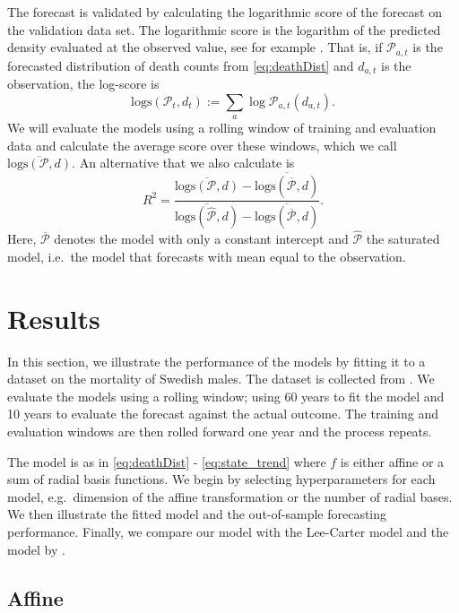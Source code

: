 \documentclass[11pt]{article}
\begin{document}
The forecast is validated by calculating the logarithmic score of the forecast on the validation data set. The logarithmic score is the logarithm of the predicted density evaluated at the observed value, see for example \cite{gneiting2007strictly}. That is, if $\mathcal P_{a,t}$ is the forecasted distribution of death counts from \eqref{eq:deathDist} and $d_{a,t}$ is the observation, the log-score is
$$
\text{logs}(\mathcal P_{t}, d_{t}) := \sum_a \log \mathcal P_{a,t}(d_{a,t}).
$$
We will evaluate the models using a rolling window of training and evaluation data and calculate the average score over these windows, which we call $\overline{ \text{logs}(\mathcal P, d) }$. An alternative that we also calculate is
$$
R^2 = \frac{\overline{ \text{logs}(\mathcal P, d) } - \overline{ \text{logs}(\overline{\mathcal P}, d) }}{\overline{ \text{logs}(\widehat{\mathcal P}, d) } - \overline{ \text{logs}(\overline{\mathcal P}, d) }}.
$$
Here, $\overline{\mathcal P}$ denotes the model with only a constant intercept and $\widehat{\mathcal P}$ the saturated model, i.e.\ the model that forecasts with mean equal to the observation.

\section{Results}\label{sec:results}

In this section, we illustrate the performance of the models by fitting it to a dataset on the mortality of Swedish males. The dataset is collected from \cite{hmd2018data}. We evaluate the models using a rolling window; using 60 years to fit the model and 10 years to evaluate the forecast against the actual outcome. The training and evaluation windows are then rolled forward one year and the process repeats.

The model is as in \eqref{eq:deathDist} - \eqref{eq:state_trend} where $f$ is either affine or a sum of radial basis functions. We begin by selecting hyperparameters for each model, e.g.\ dimension of the affine transformation or the number of radial bases. We then illustrate the fitted model and the out-of-sample forecasting performance. Finally, we compare our model with the Lee-Carter model and the model by \cite{plat2009stochastic}.

\subsection{Affine}\label{seq:results_sweden}
\end{document}
